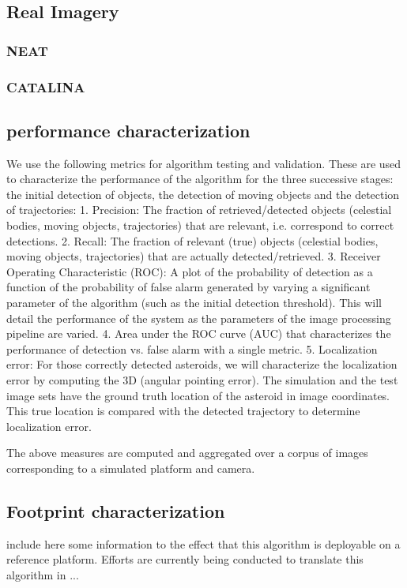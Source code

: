 \subsection{Real Imagery}
\label{ssec:real}

\subsubsection{NEAT}
\subsubsection{CATALINA}


\subsection{performance characterization}
We use the following metrics for algorithm testing and validation.  These are used to characterize the performance of the algorithm for the three successive stages: the initial detection of objects, the detection of moving objects and the detection of trajectories:
1.	Precision: The fraction of retrieved/detected objects (celestial bodies, moving objects, trajectories) that are relevant, i.e. correspond to correct detections.
2.	Recall: The fraction of relevant (true) objects (celestial bodies, moving objects, trajectories) that are actually detected/retrieved.
3.	Receiver Operating Characteristic (ROC): A plot of the probability of detection as a function of the probability of false alarm generated by varying a significant parameter of the algorithm (such as the initial detection threshold).  This will detail the performance of the system as the parameters of the image processing pipeline are varied. 
4.	Area under the ROC curve (AUC) that characterizes the performance of detection vs. false alarm with a single metric.
5.	Localization error: For those correctly detected asteroids, we will characterize the localization error by computing the 3D (angular pointing error).  The simulation and the test image sets have the ground truth location of the asteroid in image coordinates.  This true location is compared with the detected trajectory to determine localization error.

The above measures are computed and aggregated over a corpus of images corresponding to a simulated platform and camera.
\subsection{Footprint characterization}
include here some information to the effect that this algorithm is deployable on a reference platform.
Efforts are currently being conducted to translate this algorithm in ...